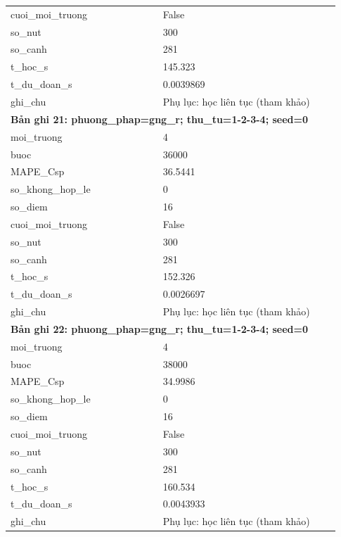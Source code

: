 \begin{longtable}{p{0.43\linewidth}p{0.50\linewidth}}
cuoi\_\allowbreak moi\_\allowbreak truong & False \\
so\_\allowbreak nut & 300 \\
so\_\allowbreak canh & 281 \\
t\_\allowbreak hoc\_\allowbreak s & 145.323 \\
t\_\allowbreak du\_\allowbreak doan\_\allowbreak s & 0.0039869 \\
ghi\_\allowbreak chu & Phụ lục: học liên tục (tham khảo) \\
\midrule
\multicolumn{2}{p{0.95\linewidth}}{\textbf{Bản ghi 21: phuong\_phap=gng\_r; thu\_tu=1-2-3-4; seed=0}} \\
moi\_\allowbreak truong & 4 \\
buoc & 36000 \\
MAPE\_\allowbreak Csp & 36.5441 \\
so\_\allowbreak khong\_\allowbreak hop\_\allowbreak le & 0 \\
so\_\allowbreak diem & 16 \\
cuoi\_\allowbreak moi\_\allowbreak truong & False \\
so\_\allowbreak nut & 300 \\
so\_\allowbreak canh & 281 \\
t\_\allowbreak hoc\_\allowbreak s & 152.326 \\
t\_\allowbreak du\_\allowbreak doan\_\allowbreak s & 0.0026697 \\
ghi\_\allowbreak chu & Phụ lục: học liên tục (tham khảo) \\
\midrule
\multicolumn{2}{p{0.95\linewidth}}{\textbf{Bản ghi 22: phuong\_phap=gng\_r; thu\_tu=1-2-3-4; seed=0}} \\
moi\_\allowbreak truong & 4 \\
buoc & 38000 \\
MAPE\_\allowbreak Csp & 34.9986 \\
so\_\allowbreak khong\_\allowbreak hop\_\allowbreak le & 0 \\
so\_\allowbreak diem & 16 \\
cuoi\_\allowbreak moi\_\allowbreak truong & False \\
so\_\allowbreak nut & 300 \\
so\_\allowbreak canh & 281 \\
t\_\allowbreak hoc\_\allowbreak s & 160.534 \\
t\_\allowbreak du\_\allowbreak doan\_\allowbreak s & 0.0043933 \\
ghi\_\allowbreak chu & Phụ lục: học liên tục (tham khảo) \\

\end{longtable}
